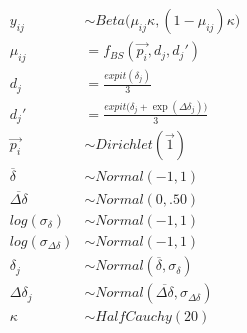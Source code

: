\begin{align*}
  y_{ij} &\sim Beta\big(\mu_{ij} \kappa, (1-\mu_{ij}) \kappa \big) \\
  \mu_{ij} &= f_{BS}(\overrightarrow{p_i}, d_j, d_j')  \\
  d_j &= \frac{expit(\delta_j)}{3} \\
  d_j' &= \frac{expit\big(\delta_j + \exp(\Delta\delta_j)\big)}{3} \\
  \overrightarrow{p_i} &\sim Dirichlet(\overrightarrow{1}) \\
  \overline{\delta} &\sim Normal(-1, 1) \\
  \overline{\Delta\delta} &\sim Normal(0, .50) \\
  log(\sigma_{\delta}) &\sim Normal(-1, 1) \\
  log(\sigma_{\Delta\delta}) &\sim Normal(-1, 1) \\
  \delta_j &\sim Normal(\overline{\delta}, \sigma_{\delta}) \\
  \Delta\delta_j &\sim Normal(\overline{\Delta\delta}, \sigma_{\Delta\delta}) \\
  \kappa &\sim HalfCauchy(20) \\
\end{align*}
